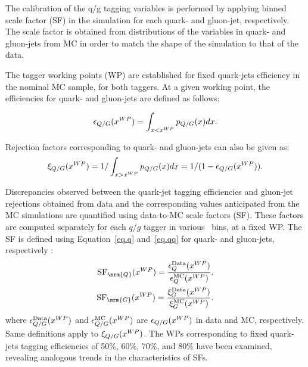 The calibration of the q/g tagging variables is performed by applying binned scale factor (SF) in the simulation for each quark- and gluon-jet, respectively. The scale factor is obtained from distributions of the variables in quark- and gluon-jets from MC in order to match the shape of the simulation to that of the data. 

The tagger working points (WP) are established for fixed quark-jets efficiency in the nominal MC sample, for both taggers. At a given working point, the efficiencies for quark- and gluon-jets are defined as follows:

\begin{eqnarray}
	\label{eq.q}
	\epsilon_{Q/G} (x^{\tiny{WP}}) = \int_{x<x^{WP}} p_{Q/G} (x) dx.
\end{eqnarray}

Rejection factors corresponding to quark- and gluon-jets can also be given as:
\begin{eqnarray}
	\label{eq.qq}
	\xi_{Q/G} (x^{\tiny{WP}}) = 1 / \int_{x>x^{WP}} p_{Q/G} (x) dx  = 1 /  (1- \epsilon_{Q/G} (x^{\tiny{WP}})).
\end{eqnarray}


Discrepancies observed between the quark-jet tagging efficiencies and gluon-jet rejections obtained from data and the corresponding values anticipated from the MC simulations are quantified using data-to-MC scale factors (SF). These factors are computed separately for each $q/g$ tagger in various \pt~bins, at a fixed WP. The SF is defined using Equation~\ref{eq.q} and~\ref{eq.qq} for quark- and gluon-jets, respectively : %
\begin{eqnarray}	
	\textrm{SF}_{\mrm{Q}} (x^{\tiny{WP}}) =\frac{\epsilon_{Q}^\text{Data}(x^{\tiny{WP}})}{\epsilon_{Q}^\text{MC}(x^{\tiny{WP}})}.\\
	\textrm{SF}_{\mrm{G}} (x^{\tiny{WP}}) =\frac{\xi_{G}^\text{Data}(x^{\tiny{WP}})}{\xi_{G}^\text{MC}(x^{\tiny{WP}})}.
\label{eq:QG-SF}
\end{eqnarray}
where $\epsilon_{Q/G}^\text{Data} (x^{\tiny{WP}}) $ and $\epsilon_{Q/G}^\text{MC} (x^{\tiny{WP}}) $ are $\epsilon_{Q/G}(x^{\tiny{WP}})$ in data and MC, respectively. Same definitions apply to $\xi_{Q/G}(x^{\tiny{WP}})$.
The WPs corresponding to fixed quark-jets tagging efficiencies of 50\%, 60\%, 70\%, and 80\% have been examined, revealing analogous trends in the characteristics of SFs.


